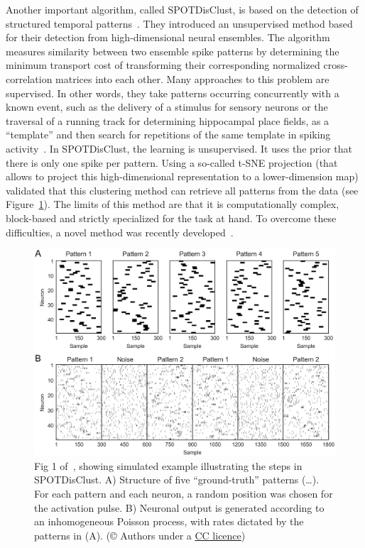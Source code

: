 \documentclass[brainsci, %
               review,submit,pdftex,moreauthors
               ]{Definitions/mdpi}
\begin{document}
Another important algorithm, called SPOTDisClust, is based on the detection of structured temporal patterns~\citep{grossberger_unsupervised_2018}. They introduced an unsupervised method based for their detection from high-dimensional neural ensembles. The algorithm measures similarity between two ensemble spike patterns by determining the minimum transport cost of transforming their corresponding normalized cross-correlation matrices into each other. Many approaches to this problem are supervised. In other words, they take patterns occurring concurrently with a known event, such as the delivery of a stimulus for sensory neurons or the traversal of a running track for determining hippocampal place fields, as a ``template'' and then search for repetitions of the same template in spiking activity~\citep{nadasdy_replay_1999,lee_combinatorial_2004}. In SPOTDisClust, the learning is unsupervised. It uses the prior that there is only one spike per pattern. Using a so-called t-SNE projection (that allows to project this high-dimensional representation to a lower-dimension map) validated that this clustering method can retrieve all patterns from the data (see Figure~\ref{fig:SPOTDisClust}). The limits of this method are that it is computationally complex, block-based and strictly specialized for the task at hand. To overcome these difficulties, a novel method was recently developed~\citep{sotomayor-gomez_spikeship_2021}.

\begin{figure}
\centering
\includegraphics[width=\linewidth]{figures/pcbi.1006283.g001.png}%
\caption{Fig 1 of~\citep{grossberger_unsupervised_2018}, showing simulated example illustrating the steps in SPOTDisClust. A) Structure of five ``ground-truth'' patterns (\ldots). For each pattern and each neuron, a random position was chosen for the activation pulse. B) Neuronal output is generated according to an inhomogeneous Poisson process, with rates dictated by the patterns in (A). (© Authors under a \href{https://journals.plos.org/ploscompbiol/article?id=10.1371/journal.pcbi.1006283}{CC licence})}\label{fig:SPOTDisClust}
\end{figure}
%
\end{document}
